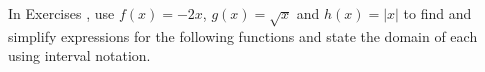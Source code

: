 {\noindent In Exercises}
{, use $f(x) = -2x$, $g(x) = \sqrt{x}$ and $h(x) = |x|$ to find and simplify expressions for the following functions and state the domain of each using interval notation. }


